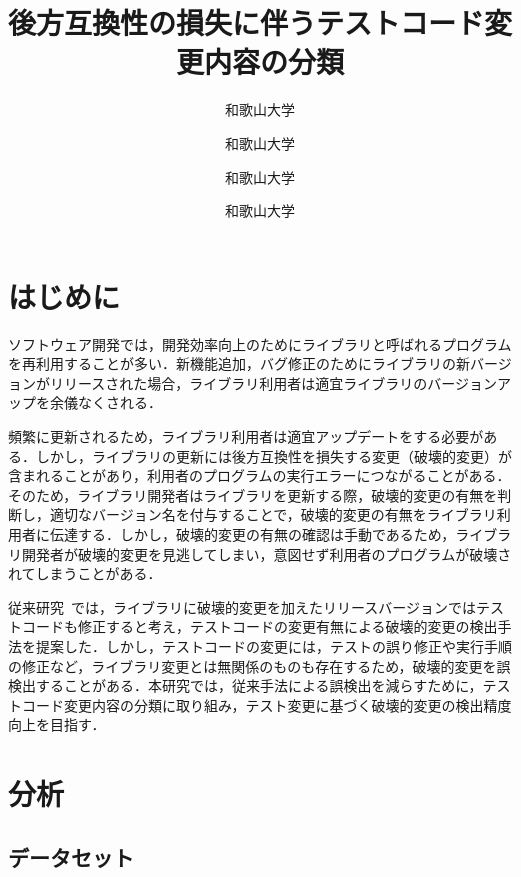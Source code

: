 \documentclass[uplatex,dvipdfmx,a4paper,twocolumn,base=11pt,jbase=11pt,ja=standard]{bxjsarticle}  %
\title{後方互換性の損失に伴うテストコード変更内容の分類}{A classification of test code changes accompanied by a lack of backward compatibility}
\author{和歌山大学}{前川　大樹}{Daiki Maekawa, Wakayama University}
\author{和歌山大学}{伊原　彰紀}{Akinori Ihara, Wakayama University}
\author{和歌山大学}{大森　楓己}{Fuki Omori, Wakayama University}
\author{和歌山大学}{才木　一也}{Kazuya Saiki, Wakayama University}
\begin{document}
\maketitle

\section{はじめに}

ソフトウェア開発では，開発効率向上のためにライブラリと呼ばれるプログラムを再利用することが多い．新機能追加，バグ修正のためにライブラリの新バージョンがリリースされた場合，ライブラリ利用者は適宜ライブラリのバージョンアップを余儀なくされる．

頻繁に更新されるため，ライブラリ利用者は適宜アップデートをする必要がある．しかし，ライブラリの更新には後方互換性を損失する変更（破壊的変更）が含まれることがあり，利用者のプログラムの実行エラーにつながることがある．そのため，ライブラリ開発者はライブラリを更新する際，破壊的変更の有無を判断し，適切なバージョン名を付与することで，破壊的変更の有無をライブラリ利用者に伝達する．しかし，破壊的変更の有無の確認は手動であるため，ライブラリ開発者が破壊的変更を見逃してしまい，意図せず利用者のプログラムが破壊されてしまうことがある．

従来研究~\cite{FOSE2021_Matsuda}では，ライブラリに破壊的変更を加えたリリースバージョンではテストコードも修正すると考え，テストコードの変更有無による破壊的変更の検出手法を提案した．しかし，テストコードの変更には，テストの誤り修正や実行手順の修正など，ライブラリ変更とは無関係のものも存在するため，破壊的変更を誤検出することがある．本研究では，従来手法による誤検出を減らすために，テストコード変更内容の分類に取り組み，テスト変更に基づく破壊的変更の検出精度向上を目指す．

\section{分析}
\subsection{データセット}
\end{document}
